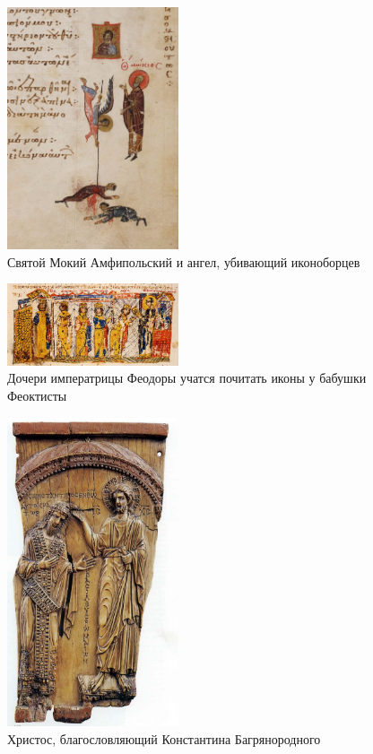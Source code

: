 \begin{figure}[ht]
    \centering
    \includegraphics[width=0.45\textwidth]{img/vizant/4.jpg}
    \caption{Святой Мокий Амфипольский и ангел, убивающий иконоборцев}
    \label{fig:ikoni}
\end{figure}

\begin{figure}[ht]
    \centering
    \includegraphics[width=0.45\textwidth]{img/vizant/5.jpg}
    \caption{Дочери императрицы Феодоры учатся почитать иконы у бабушки Феоктисты}
    \label{fig:feodora}
\end{figure}

\begin{figure}[ht]
    \centering
    \includegraphics[width=0.45\textwidth]{img/vizant/6_Porphyrogenetus.jpg}
    \caption{Христос, благословляющий Константина Багрянородного}
    \label{fig:christ}
\end{figure}


